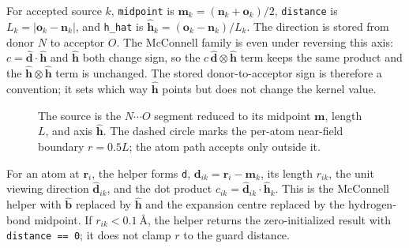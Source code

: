 \documentclass[11pt]{article}
\newcommand{\code}[1]{\texttt{#1}}
\begin{document}
For accepted source \(k\), \code{midpoint} is
\(\bm m_k=(\bm n_k+\bm o_k)/2\), \code{distance} is
\(L_k=|\bm o_k-\bm n_k|\), and \code{h\_hat} is
\(\hat{\bm h}_k=(\bm o_k-\bm n_k)/L_k\). The direction is stored from donor
\(N\) to acceptor \(O\). The McConnell family is even under reversing this axis:
\(c=\hat{\bm d}\cdot\hat{\bm h}\) and \(\hat{\bm h}\) both change sign, so the
\(c\,\hat{\bm d}\otimes\hat{\bm h}\) term keeps the same product and the
\(\hat{\bm h}\otimes\hat{\bm h}\) term is unchanged. The stored
donor-to-acceptor sign is therefore a convention; it sets which way
\(\hat{\bm h}\) points but does not change the kernel value.

\begin{figure}[ht]
\centering
{}
\caption{The source is the \(N\cdots O\) segment reduced to its midpoint
\(\bm m\), length \(L\), and axis \(\hat{\bm h}\). The dashed circle marks the
per-atom near-field boundary \(r=0.5L\); the atom path accepts only outside it.}
\end{figure}

For an atom at \(\bm r_i\), the helper forms \code{d},
\(\bm d_{ik}=\bm r_i-\bm m_k\), its length \(r_{ik}\), the unit viewing
direction \(\hat{\bm d}_{ik}\), and the dot product
\(c_{ik}=\hat{\bm d}_{ik}\cdot\hat{\bm h}_k\). This is the McConnell helper
with \(\hat{\bm b}\) replaced by \(\hat{\bm h}\) and the expansion centre
replaced by the hydrogen-bond midpoint. If \(r_{ik}<\SI{0.1}{\angstrom}\), the
helper returns the zero-initialized result with \code{distance == 0}; it does
not clamp \(r\) to the guard distance.
\end{document}
